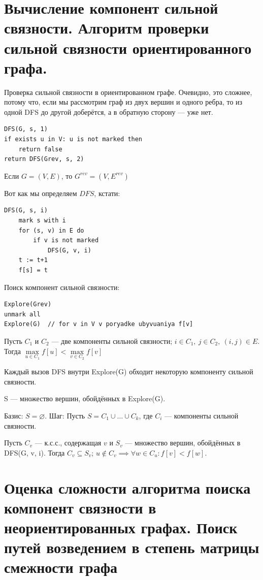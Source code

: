\documentclass[a4paper,12pt]{article}
\begin{document}
\newpage
\section{Вычисление компонент сильной связности. Алгоритм проверки сильной связности ориентированного графа.}

Проверка сильной связности в ориентированном графе. Очевидно, это сложнее, потому что, если мы рассмотрим граф из двух вершин и одного ребра, то из одной DFS до другой доберётся, а в обратную сторону --- уже нет.

\begin{lstlisting}
DFS(G, s, 1)
if exists u in V: u is not marked then
    return false
return DFS(Grev, s, 2)
\end{lstlisting}

Если $G = (V, E)$, то $G^{rev} = (V, E^{rev})$

Вот как мы определяем $DFS$, кстати:

\begin{lstlisting}
DFS(G, s, i)
    mark s with i
    for (s, v) in E do
        if v is not marked
            DFS(G, v, i)
    t := t+1
    f[s] = t
\end{lstlisting}

Поиск компонент сильной связности:

\begin{lstlisting}
Explore(Grev)
unmark all
Explore(G)  // for v in V v poryadke ubyvuaniya f[v]
\end{lstlisting}

Пусть $C_1$ и $C_2$ --- две компоненты сильной связности; $i\in C_1,\ j\in C_2,\ (i,j)\in E$. Тогда $\max\limits_{u\in C_1} f[u] < \max\limits_{v\in C_2} f[v]$

Каждый вызов DFS внутри Explore(G) обходит некоторую компоненту сильной связности.

S --- множество вершин, обойдённых в Explore(G).

Базис: $S = \varnothing$.
Шаг: Пусть $S = C_1 \cup\ldots\cup C_k$, где $C_i$ --- компоненты сильной связности.

Пусть $C_v$ --- к.с.с., содержащая $v$ и $S_v$ --- множество вершин, обойдённых в DFS(G, v, i). Тогда $C_v \subseteq S_v$; $u\not\in C_v \implies \forall w \in C_u: f[v] < f[w]$.
\newpage
\section{Оценка сложности алгоритма поиска компонент связности в неориентированных графах. Поиск путей возведением в степень матрицы смежности графа}
\end{document}
